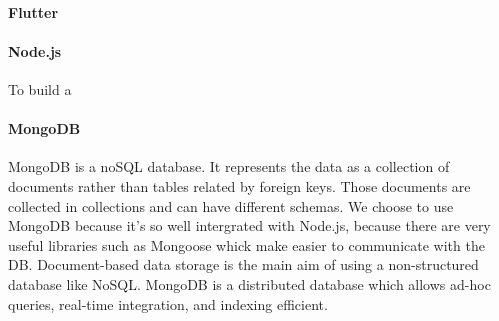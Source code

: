 \paragraph{Flutter}


\paragraph{Node.js}
To build a

\paragraph{MongoDB}
MongoDB is a noSQL database. It represents the data as a collection of documents rather than tables related by foreign keys. Those documents are collected in collections and can have different schemas. We choose to use MongoDB because it's so well intergrated with Node.js, because there are very useful libraries such as Mongoose whick make easier to communicate with the DB. Document-based data storage is the main aim of using a non-structured database like NoSQL. MongoDB is a distributed database which allows ad-hoc queries, real-time integration, and indexing efficient.
